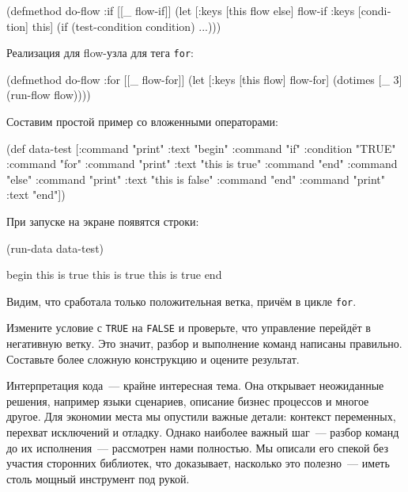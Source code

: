 \begin{english}
  \begin{clojure}
(defmethod do-flow :if
  [[_ flow-if]]
  (let [{:keys [this flow else]} flow-if
        {:keys [condition]} this]
    (if (test-condition condition)
      ...)))
  \end{clojure}
\end{english}

Реализация для flow-узла для тега \texttt{for}:

\begin{english}
  \begin{clojure}
(defmethod do-flow :for
  [[_ flow-for]]
  (let [{:keys [this flow]} flow-for]
    (dotimes [_ 3]
      (run-flow flow))))
  \end{clojure}
\end{english}

Составим простой пример со вложенными операторами:

\begin{english}
  \begin{clojure}
(def data-test
  [{:command "print" :text "begin"}
   {:command "if" :condition "TRUE"}
     {:command "for"}
       {:command "print" :text "this is true"}
     {:command "end"}
   {:command "else"}
     {:command "print" :text "this is false"}
   {:command "end"}
   {:command "print" :text "end"}])
  \end{clojure}
\end{english}

При запуске на экране появятся строки:

\begin{english}
  \begin{clojure}
(run-data data-test)

begin
this is true
this is true
this is true
end
  \end{clojure}
\end{english}

Видим, что сработала только положительная ветка, причём в цикле
\texttt{for}.

Измените условие с \verb|TRUE| на \verb|FALSE| и проверьте, что управление
перейдёт в негативную ветку. Это значит, разбор и выполнение команд написаны
правильно. Составьте более сложную конструкцию и оцените результат.

Интерпретация кода~--- крайне интересная тема. Она открывает неожиданные
решения, например языки сценариев, описание бизнес процессов и многое
другое. Для экономии места мы опустили важные детали: контекст переменных,
перехват исключений и отладку. Однако наиболее важный шаг~--- разбор команд до
их исполнения~--- рассмотрен нами полностью. Мы описали его спекой без участия
сторонних библиотек, что доказывает, насколько это полезно~--- иметь столь
мощный инструмент под рукой.

